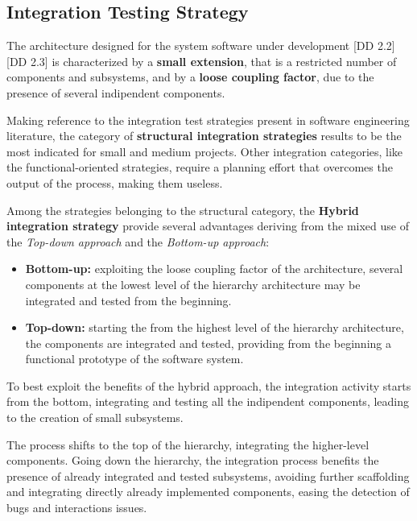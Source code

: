 \subsection{Integration Testing Strategy}
\label{sec:integration-testing-strategy}

The architecture designed for the system software under development [DD 2.2] [DD 2.3] is characterized by a \textbf{small extension}, that is a restricted number of components and subsystems, and by a \textbf{loose coupling factor}, due to the presence of several indipendent components.

Making reference to the integration test strategies present in software engineering literature, the category of \textbf{structural integration strategies} results to be the most indicated for small and medium projects.
Other integration categories, like the functional-oriented strategies, require a planning effort that overcomes the output of the process, making them useless.

Among the strategies belonging to the structural category, the \textbf{Hybrid integration strategy} provide several advantages deriving from the mixed use of the \textit{Top-down approach} and the \textit{Bottom-up approach}:

\begin{itemize}
	\item \textbf{Bottom-up:} exploiting the loose coupling factor of the architecture, several components at the lowest level of the hierarchy architecture may be integrated and tested from the beginning.
	\item \textbf{Top-down:} starting the from the highest level of the hierarchy architecture, the components are integrated and tested, providing from the beginning a functional prototype of the software system.
\end{itemize}

To best exploit the benefits of the hybrid approach, the integration activity starts from the bottom, integrating and testing all the indipendent components, leading to the creation of small subsystems.

The process shifts to the top of the hierarchy, integrating the higher-level components. Going down the hierarchy, the integration process benefits the presence of already integrated and tested subsystems, avoiding further scaffolding and integrating directly already implemented components, easing the detection of bugs and interactions issues.
